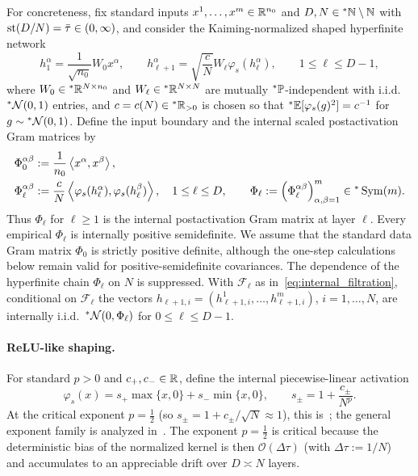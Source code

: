 For concreteness, fix standard inputs $x^1, \dots, x^m \in \mathbb{R}^{n_0}$ and $D, N \in {}^*\mathbb{N} \setminus \mathbb{N}$ with $\operatorname{st}(D/N) = \bar{\tau} \in (0, \infty)$, and consider the Kaiming-normalized shaped hyperfinite network
\begin{equation}\label{eq:shaped_net}
h_1^\alpha = \frac{1}{\sqrt{n_0}} W_0 x^\alpha, \qquad h_{\ell+1}^\alpha = \sqrt{\frac{c}{N}} W_\ell \varphi_s(h_\ell^\alpha), \qquad 1 \le \ell \le D - 1,
\end{equation}
where $W_0 \in {}^*\mathbb{R}^{N \times n_0}$ and $W_\ell \in {}^*\mathbb{R}^{N \times N}$ are mutually ${}^*\mathbb{P}$-independent with i.i.d.\ ${}^*\mathcal{N}(0, 1)$ entries, and $c = c(N) \in {}^*\mathbb{R}_{>0}$ is chosen so that ${}^*\mathbb{E}[\varphi_s(g)^2] = c^{-1}$ for $g \sim {}^*\mathcal{N}(0, 1)$. Define the input boundary and the internal scaled postactivation Gram matrices by
\begin{equation}\label{eq:shaped_gram}
\begin{aligned}
\Phi_0^{\alpha\beta} &:= \frac{1}{n_0}\left\langle x^\alpha, x^\beta \right\rangle, \\
\Phi_\ell^{\alpha\beta} &:= \frac{c}{N}\left\langle \varphi_s(h_\ell^\alpha), \varphi_s(h_\ell^\beta) \right\rangle, \quad 1 \le \ell \le D, \qquad \Phi_\ell := \left(\Phi_\ell^{\alpha\beta}\right)_{\alpha,\beta=1}^m \in {}^*\operatorname{Sym}(m).
\end{aligned}
\end{equation}
Thus $\Phi_\ell$ for $\ell \ge 1$ is the internal postactivation Gram matrix at layer $\ell$. Every empirical $\Phi_\ell$ is internally positive semidefinite. We assume that the standard data Gram matrix $\Phi_0$ is strictly positive definite, although the one-step calculations below remain valid for positive-semidefinite covariances. The dependence of the hyperfinite chain $\Phi_\ell$ on $N$ is suppressed. With $\mathcal{F}_\ell$ as in~\eqref{eq:internal_filtration}, conditional on $\mathcal{F}_\ell$ the vectors $h_{\ell+1,i} = (h_{\ell+1,i}^1, \dots, h_{\ell+1,i}^m)$, $i = 1, \dots, N$, are internally i.i.d.\ ${}^*\mathcal{N}(0, \Phi_\ell)$ for $0 \le \ell \le D - 1$.

\paragraph{ReLU-like shaping.}
For standard $p > 0$ and $c_+, c_- \in \mathbb{R}$, define the internal piecewise-linear activation
\begin{equation}\label{eq:relu_like_shaping}
\varphi_s(x) = s_+ \max\{x, 0\} + s_- \min\{x, 0\}, \qquad s_\pm = 1 + \frac{c_\pm}{N^p}.
\end{equation}
At the critical exponent $p = \frac{1}{2}$ (so $s_\pm = 1 + c_\pm / \sqrt{N} \approx 1$), this is~\cite[Definition~3.1]{li2022neural}; the general exponent family is analyzed in~\cite[Proposition~3.4]{li2022neural}. The exponent $p = \frac{1}{2}$ is critical because the deterministic bias of the normalized kernel is then $\mathcal{O}(\Delta\tau)$ (with $\Delta\tau := 1/N$) and accumulates to an appreciable drift over $D \asymp N$ layers.

